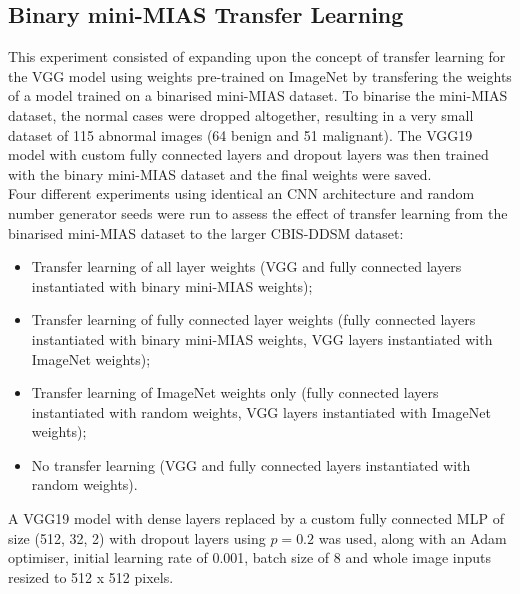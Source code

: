 
\subsection{Binary mini-MIAS Transfer Learning}
\label{sec:evaluation-transfer-learning}

This experiment consisted of expanding upon the concept of transfer learning for the VGG model using weights pre-trained on ImageNet by transfering the weights of a model trained on a binarised mini-MIAS dataset. To binarise the mini-MIAS dataset, the normal cases were dropped altogether, resulting in a very small dataset of 115 abnormal images (64 benign and 51 malignant). The VGG19 model with custom fully connected layers and dropout layers was then trained with the binary mini-MIAS dataset and the final weights were saved.\\

Four different experiments using identical an CNN architecture and random number generator seeds were run to assess the effect of transfer learning from the binarised mini-MIAS dataset to the larger CBIS-DDSM dataset:
\begin{itemize}
    \item Transfer learning of all layer weights (VGG and fully connected layers instantiated with binary mini-MIAS weights);
    \item Transfer learning of fully connected layer weights (fully connected layers instantiated with binary mini-MIAS weights, VGG layers instantiated with ImageNet weights);
    \item Transfer learning of ImageNet weights only (fully connected layers instantiated with random weights, VGG layers instantiated with ImageNet weights);
    \item No transfer learning (VGG and fully connected layers instantiated with random weights).
\end{itemize}




A VGG19 model with dense layers replaced by a custom fully connected MLP of size (512, 32, 2) with dropout layers using $p=0.2$ was used, along with an Adam optimiser, initial learning rate of 0.001, batch size of 8 and whole image inputs resized to 512 x 512 pixels.\\

